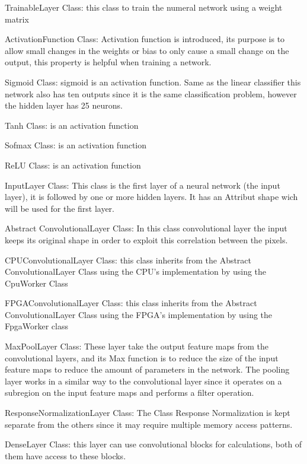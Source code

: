 \documentclass[parskip=full]{scrartcl}
\begin{document}
TrainableLayer Class: this class to train the numeral network using a weight matrix

ActivationFunction Class:  Activation function is introduced, its purpose is to allow small changes in the weights or bias to only cause a small change on the output, this property is helpful when training a network.

Sigmoid Class: sigmoid is an activation function.  Same as the linear classifier this network also has ten outputs since it is the same classification problem, however the hidden layer has 25 neurons.

Tanh Class: is an activation function

Sofmax Class: is an activation function

ReLU Class:  is an activation function









InputLayer Class: This class is the first layer of a neural network (the input layer), it is followed by one or more hidden layers.  It has an Attribut shape wich will be used for the first layer.

Abstract ConvolutionalLayer Class: In this class convolutional layer the input keeps its original shape in order to exploit this correlation between the pixels. 

CPUConvolutionalLayer Class: this class inherits from the Abstract ConvolutionalLayer Class using the CPU’s implementation by using the CpuWorker Class

FPGAConvolutionalLayer Class: this class inherits from the Abstract ConvolutionalLayer Class using the FPGA’s implementation by using the FpgaWorker class

MaxPoolLayer Class: These layer take the output feature maps from the convolutional layers, and its Max function is to reduce the size of the input feature maps to reduce the amount of parameters in the network.
The pooling layer works in a similar way to the convolutional layer since it operates on a subregion on the input feature maps and performs a filter operation.

ResponseNormalizationLayer Class: The Class Response Normalization is kept separate from the others since it may require multiple memory access patterns.

DenseLayer Class:  this layer can use convolutional blocks for calculations, both of them have access to these blocks.
\end{document}
